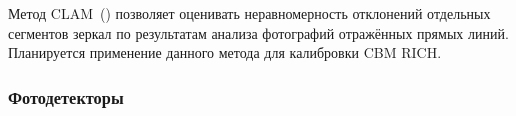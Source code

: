 Метод CLAM~(\cite{CLAM}) позволяет оценивать неравномерность отклонений отдельных сегментов зеркал по результатам анализа фотографий отражённых прямых линий. Планируется применение данного метода для калибровки CBM RICH.



%                                      

\subsubsection{Фотодетекторы}\label{sec:CbmRichCamera}

